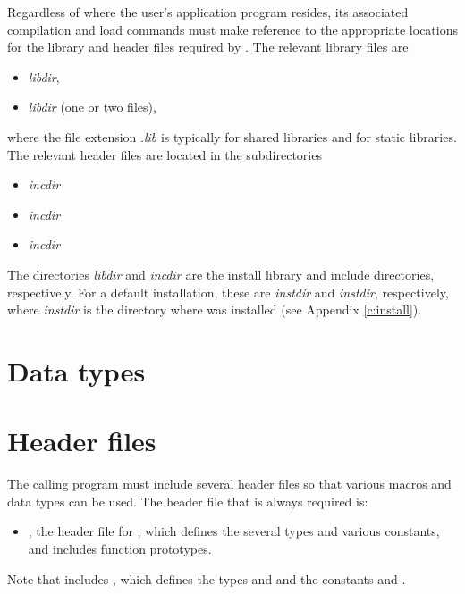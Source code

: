 Regardless of where the user's application program resides, its
associated compilation and load commands must make reference to the
appropriate locations for the library and header files required by
{\ida}.  The relevant library files are
\begin{itemize}
\item {\em libdir},
\item {\em libdir} (one or two files),
\end{itemize}
where the file extension .{\em lib} is typically  for shared libraries
and  for static libraries. The relevant header files are located in
the subdirectories
\begin{itemize}
\item {\em incdir}
\item {\em incdir}
\item {\em incdir}
\end{itemize}
The directories {\em libdir} and {\em incdir} are the install library
and include directories, respectively. For a default installation,
these are {\em instdir} and {\em instdir},
respectively, where {\em instdir} is the directory where {\sundials}
was installed (see Appendix \ref{c:install}).

\section{Data types}\label{s:types}


\section{Header files}\label{ss:header_sim}
The calling program must include several header files so that various macros
and data types can be used. The header file that is always required is:
\begin{itemize}
\item  {}, 
  the header file for {\ida}, which defines the several
  types and various constants, and includes function prototypes.
\end{itemize}
Note that  includes , 
which defines the types  and 
and the constants  and .

